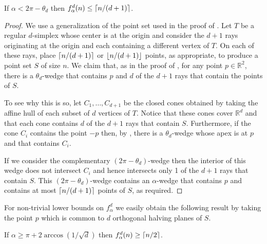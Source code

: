 \documentclass[lotsofwhite]{patmorin}
\begin{document}
\begin{lem}
If $\alpha < 2\pi-\theta_d$ then $f^d_\alpha(n) \le \left\lceil n/(d+1) \right\rceil$.
\end{lem}

\begin{proof} 
We use a generalization of the point set used in the proof of
.  Let $T$ be a regular $d$-simplex whose center is at the
origin and consider the $d+1$ rays originating at the origin and each
containing a different vertex of $T$.  On each of these rays, place
$\left\lceil n/(d+1) \right\rceil$ or $\left\lfloor n/(d+1) \right\rfloor$ points, as appropriate, to
produce a point set $S$ of size $n$.  We claim that, as in the proof
of , for any point $p\in\mathbb{R}^2$, there is a
$\theta_d$-wedge that contains $p$ and $d$ of the $d+1$ rays that
contain the points of $S$. 

To see why this is so, let $C_1,\ldots,C_{d+1}$ be the closed cones
obtained by taking the affine hull of each subset of $d$ vertices of
$T$.  Notice that these cones cover $\mathbb{R}^d$ and that each cone
contains $d$ of the $d+1$ rays that contain $S$.  Furthermore, if the
cone $C_i$ contains the point $-p$ then, by , there
is a $\theta_d$-wedge whose apex is at $p$ and that contains $C_i$.  

If we consider the complementary $(2\pi-\theta_d)$-wedge then the
interior of this wedge does not intersect $C_i$ and hence intersects
only 1 of the $d+1$ rays that contain $S$. This
$(2\pi-\theta_d)$-wedge contains an $\alpha$-wedge that contains $p$
and contains at most $\left\lceil n/(d+1) \right\rceil$ points of $S$, as required.
\end{proof}

For non-trivial lower bounds on $f^d_\alpha$ we easily obtain the
following result by taking the point $p$ which is common to $d$
orthogonal halving planes of $S$.

\begin{lem}
If $\alpha \ge \pi+2\arccos(1/\sqrt{d})$ then $f_\alpha^d(n)\ge \left\lceil n/2 \right\rceil$.
\end{lem}

\begin{lem}

\end{lem}
\end{document}

